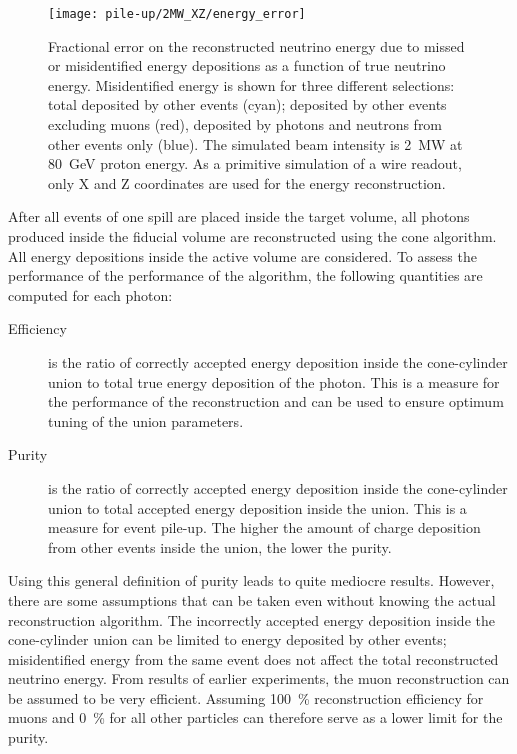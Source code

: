 \begin{figure}[htb]
	\centering
	\texttt{[image: pile-up/2MW\_XZ/energy\_error]}
	\caption{Fractional error on the reconstructed neutrino energy due to missed or misidentified energy depositions as a function of true neutrino energy.
	Misidentified energy is shown for three different selections: total deposited by other events (cyan); deposited by other events excluding muons (red), deposited by photons and neutrons from other events only (blue).
	The simulated beam intensity is \SI{2}{\mega\watt} at \SI{80}{\giga\electronvolt} proton energy.
	As a primitive simulation of a wire readout, only X and Z coordinates are used for the energy reconstruction.}
	\label{fig:dune-nd_2MW-XZ-energy-error}
\end{figure}

After all events of one spill are placed inside the target volume, all \Pgpz photons produced inside the fiducial volume are reconstructed using the cone algorithm.
All energy depositions inside the active volume are considered.
To assess the performance of the performance of the algorithm, the following quantities are computed for each photon:
\begin{description}
	\item[Efficiency] is the ratio of correctly accepted energy deposition inside the cone-cylinder union to total true energy deposition of the photon.
		This is a measure for the performance of the reconstruction and can be used to ensure optimum tuning of the union parameters.
	\item[Purity] is the ratio of correctly accepted energy deposition inside the cone-cylinder union to total accepted energy deposition inside the union.
		This is a measure for event pile-up.
		The higher the amount of charge deposition from other events inside the union, the lower the purity.
\end{description}
Using this general definition of purity leads to quite mediocre results.
However, there are some assumptions that can be taken even without knowing the actual reconstruction algorithm.
The incorrectly accepted energy deposition inside the cone-cylinder union can be limited to energy deposited by other events; misidentified energy from the same event does not affect the total reconstructed neutrino energy.
From results of earlier experiments, the muon reconstruction can be assumed to be very efficient.
Assuming \SI{100}{\percent} reconstruction efficiency for muons and \SI{0}{\percent} for all other particles can therefore serve as a lower limit for the purity.
